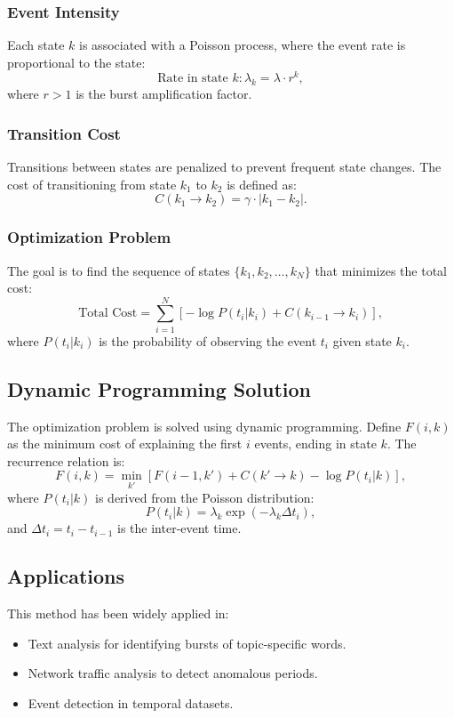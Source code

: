 \documentclass[a4paper,9pt]{extarticle}
\begin{document}
\subsubsection{Event Intensity}
Each state $k$ is associated with a Poisson process, where the event rate is proportional to the state:
\[
\text{Rate in state } k: \lambda_k = \lambda \cdot r^k,
\]
where $r > 1$ is the burst amplification factor.

\subsubsection{Transition Cost}
Transitions between states are penalized to prevent frequent state changes. The cost of transitioning from state $k_1$ to $k_2$ is defined as:
\[
C(k_1 \to k_2) = \gamma \cdot |k_1 - k_2|.
\]

\subsubsection{Optimization Problem}
The goal is to find the sequence of states $\{k_1, k_2, \dots, k_N\}$ that minimizes the total cost:
\[
\text{Total Cost} = \sum_{i=1}^N \left[ -\log P(t_i | k_i) + C(k_{i-1} \to k_i) \right],
\]
where $P(t_i | k_i)$ is the probability of observing the event $t_i$ given state $k_i$.

\subsection{Dynamic Programming Solution}
The optimization problem is solved using dynamic programming. Define $F(i, k)$ as the minimum cost of explaining the first $i$ events, ending in state $k$. The recurrence relation is:
\[
F(i, k) = \min_{k'} \left[ F(i-1, k') + C(k' \to k) - \log P(t_i | k) \right],
\]
where $P(t_i | k)$ is derived from the Poisson distribution:
\[
P(t_i | k) = \lambda_k \exp(-\lambda_k \Delta t_i),
\]
and $\Delta t_i = t_i - t_{i-1}$ is the inter-event time.

\subsection{Applications}
This method has been widely applied in:
\begin{itemize}
    \item Text analysis for identifying bursts of topic-specific words.
    \item Network traffic analysis to detect anomalous periods.
    \item Event detection in temporal datasets.
\end{itemize}
\end{document}

